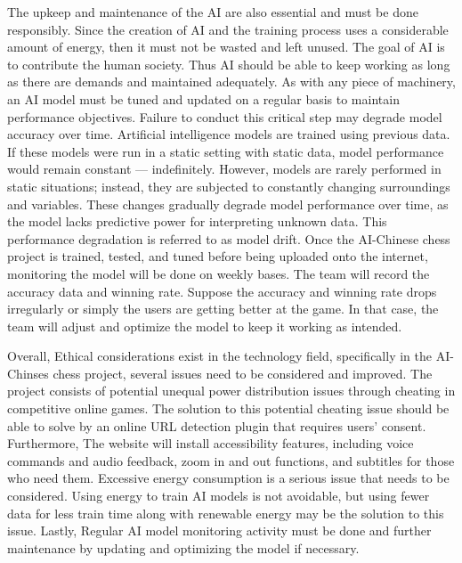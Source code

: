 \documentclass[10pt,twocolumn]{article}
\begin{document}
	The upkeep and maintenance of the AI are also essential and must be done responsibly. Since the creation of AI and the training process uses a considerable amount of energy, then it must not be wasted and left unused. The goal of AI is to contribute the human society. Thus AI should be able to keep working as long as there are demands and maintained adequately. As with any piece of machinery, an AI model must be tuned and updated on a regular basis to maintain performance objectives. Failure to conduct this critical step may degrade model accuracy over time. Artificial intelligence models are trained using previous data. If these models were run in a static setting with static data, model performance would remain constant — indefinitely. However, models are rarely performed in static situations; instead, they are subjected to constantly changing surroundings and variables. These changes gradually degrade model performance over time, as the model lacks predictive power for interpreting unknown data. This performance degradation is referred to as model drift\cite{AIModelMaintenance}. Once the AI-Chinese chess project is trained, tested, and tuned before being uploaded onto the internet, monitoring the model will be done on weekly bases. The team will record the accuracy data and winning rate. Suppose the accuracy and winning rate drops irregularly or simply the users are getting better at the game. In that case, the team will adjust and optimize the model to keep it working as intended. 

	Overall, Ethical considerations exist in the technology field, specifically in the AI-Chinses chess project, several issues need to be considered and improved. The project consists of potential unequal power distribution issues through cheating in competitive online games. The solution to this potential cheating issue should be able to solve by an online URL detection plugin that requires users' consent. Furthermore, The website will install accessibility features, including voice commands and audio feedback, zoom in and out functions, and subtitles for those who need them. Excessive energy consumption is a serious issue that needs to be considered. Using energy to train AI models is not avoidable, but using fewer data for less train time along with renewable energy may be the solution to this issue. Lastly, Regular AI model monitoring activity must be done and further maintenance by updating and optimizing the model if necessary. 


\printbibliography 
\end{document}

